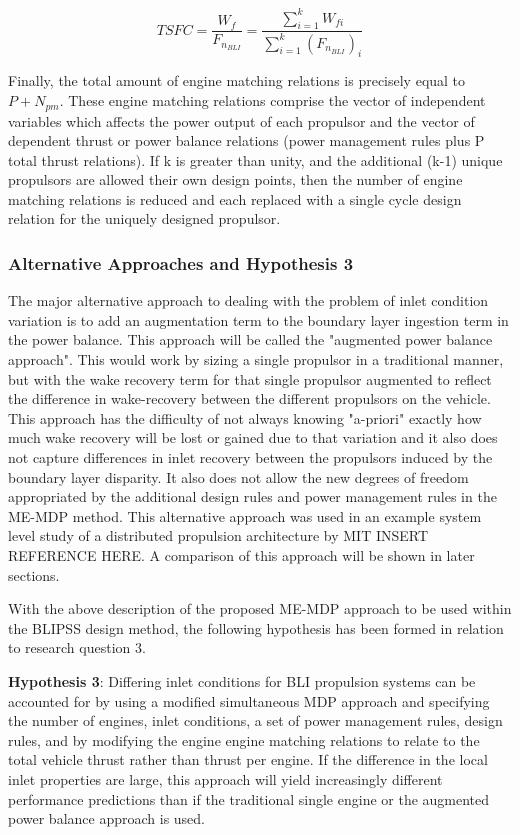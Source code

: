 			\begin{equation}
				TSFC = \dfrac{W_f}{F_{n_{BLI}}} = \dfrac{\sum_{i=1}^{k}{W_{fi}}}{\sum_{i=1}^{k}{(F_{n_{BLI}})_i}}
			\end{equation}
			
			Finally, the total amount of engine matching relations is precisely equal to $P + N_{pm}$.  These engine matching relations comprise the vector of independent variables which affects the power output of each propulsor and the vector of dependent thrust or power balance relations (power management rules plus P total thrust relations).  If k is greater than unity, and the additional (k-1) unique propulsors are allowed their own design points, then the number of engine matching relations is reduced and each replaced with a single cycle design relation for the uniquely designed propulsor.						
			
		\subsubsection{Alternative Approaches and Hypothesis 3}
			The major alternative approach to dealing with the problem of inlet condition variation is to add an augmentation term to the boundary layer ingestion term in the power balance.  This approach will be called the "augmented power balance approach".  This would work by sizing a single propulsor in a traditional manner, but with the wake recovery term for that single propulsor augmented to reflect the difference in wake-recovery between the different propulsors on the vehicle.  This approach has the difficulty of not always knowing "a-priori" exactly how much wake recovery will be lost or gained due to that variation and it also does not capture differences in inlet recovery between the propulsors induced by the boundary layer disparity.  It also does not allow the new degrees of freedom appropriated by the additional design rules and power management rules in the ME-MDP method.  This alternative approach was used in an example system level study of a distributed propulsion architecture by MIT INSERT REFERENCE HERE.  A comparison of this approach will be shown in later sections.  
			
			With the above description of the proposed ME-MDP approach to be used within the BLIPSS design method, the following hypothesis has been formed in relation to research question 3.  
			

			\noindent\makebox[\linewidth]{\rule{\textwidth}{3pt}}				
			\textbf{Hypothesis 3}: Differing inlet conditions for BLI propulsion systems can be accounted for by using a modified simultaneous MDP approach and specifying the number of engines, inlet conditions, a set of power management rules, design rules, and by modifying the engine engine matching relations to relate to the total vehicle thrust rather than thrust per engine.  If the difference in the local inlet properties are large, this approach will yield increasingly different performance predictions than if the traditional single engine or the augmented power balance approach is used.  		\\										 						  			
			\noindent\makebox[\linewidth]{\rule{\textwidth}{3pt}}				
	
